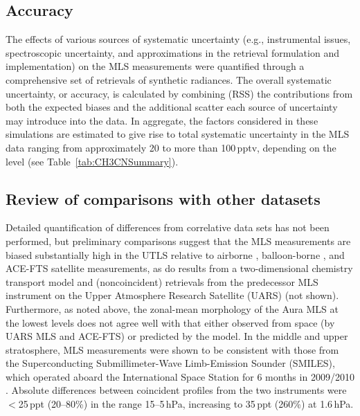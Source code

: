 \subsection{Accuracy}

The effects of various sources of systematic uncertainty (e.g., instrumental issues, spectroscopic uncertainty, and approximations in the retrieval formulation and implementation) on the MLS \thisv {} measurements were quantified through a comprehensive set of retrievals of synthetic radiances. The overall systematic uncertainty, or accuracy, is calculated by combining (RSS) the contributions from both the expected biases and the additional scatter each source of uncertainty may introduce into the data. In aggregate, the factors considered in these simulations are estimated to give rise to total systematic uncertainty in the MLS \thisv {} data ranging from approximately 20 to more than 100\,pptv, depending on the level (see Table~\ref{tab:CH3CNSummary}). 

\subsection{Review of comparisons with other datasets}

Detailed quantification of differences from correlative data sets has not been performed, but preliminary comparisons suggest that the MLS  measurements are biased substantially high in the UTLS relative to airborne \citep{SinghEtal:2003}, balloon-borne \citep{KleinboehlEtal:2005}, and \mbox{ACE-FTS} satellite \citep{HarrisonAndBernath:2013}  measurements, as do results from a two-dimensional chemistry transport model and (noncoincident)  retrievals from the predecessor MLS instrument on the Upper Atmosphere Research Satellite (UARS) \citep{LiveseyEtal:2001} (not shown). Furthermore, as noted above, the zonal-mean morphology of the Aura MLS  at the lowest levels does not agree well with that either observed from space (by UARS MLS and \mbox{ACE-FTS}) or predicted by the model. In the middle and upper stratosphere, \viv MLS  measurements were shown to be consistent with those from the Superconducting Submillimeter-Wave Limb-Emission Sounder (SMILES), which operated aboard the International Space Station for 6 months in 2009/2010 \citep{FujinawaEtal:2020}. Absolute differences between coincident  profiles from the two instruments were $<$25\,ppt (20--80\%) in the range 15--5\,hPa, increasing to 35\,ppt (260\%) at 1.6\,hPa.

